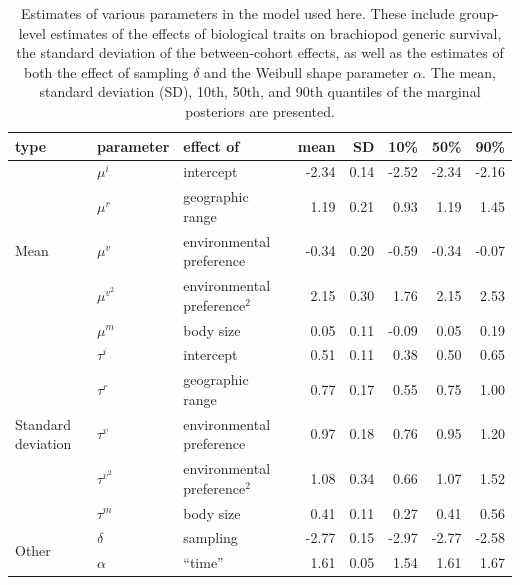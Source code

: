 \documentclass[11pt]{article}
\begin{document}
\clearpage
\begin{table}[h]
  \centering
  \caption{Estimates of various parameters in the model used here. These include group-level estimates of the effects of biological traits on brachiopod generic survival, the standard deviation of the between-cohort effects, as well as the estimates of both the effect of sampling \(\delta\) and the Weibull shape parameter \(\alpha\). The mean, standard deviation (SD), 10th, 50th, and 90th quantiles of the marginal posteriors are presented.}
  \begin{tabular}{ l | l p{2.5cm} r r r r r }
    \hline
    type & parameter & effect of & mean & SD & 10\% & 50\% & 90\% \\ 
    \hline
    \multirow{5}{*}{Mean} & \(\mu^{i}\) & intercept & -2.34 & 0.14 & -2.52 & -2.34 & -2.16 \\ 
    & \(\mu^{r}\) & geographic range &  1.19 & 0.21 & 0.93 & 1.19 & 1.45 \\ 
    & \(\mu^{v}\) & environmental preference &  -0.34 & 0.20 & -0.59 & -0.34 & -0.07 \\ 
    & \(\mu^{v^{2}}\) & environmental preference\(^{2}\) &  2.15 & 0.30 & 1.76 & 2.15 & 2.53 \\ 
    & \(\mu^{m}\) & body size & 0.05 & 0.11 & -0.09 & 0.05 & 0.19 \\ 
    \hline
    \multirow{5}{*}{Standard deviation} & \(\tau^{i}\) & intercept &  0.51 & 0.11 & 0.38 & 0.50 & 0.65 \\ 
    & \(\tau^{r}\) & geographic range & 0.77 & 0.17 & 0.55 & 0.75 & 1.00 \\ 
    & \(\tau^{v}\) & environmental preference & 0.97 & 0.18 & 0.76 & 0.95 & 1.20 \\ 
    & \(\tau^{v^{2}}\) & environmental preference\(^{2}\) &  1.08 & 0.34 & 0.66 & 1.07 & 1.52 \\ 
    & \(\tau^{m}\) & body size &  0.41 & 0.11 & 0.27 & 0.41 & 0.56 \\ 
    \hline
    \multirow{2}{*}{Other} & \(\delta\) & sampling & -2.77 & 0.15 & -2.97 & -2.77 & -2.58 \\ 
    & \(\alpha\) & ``time'' & 1.61 & 0.05 & 1.54 & 1.61 & 1.67 \\ 
    \hline
  \end{tabular}
  \label{tab:param}
\end{table}
\clearpage
\end{document}

